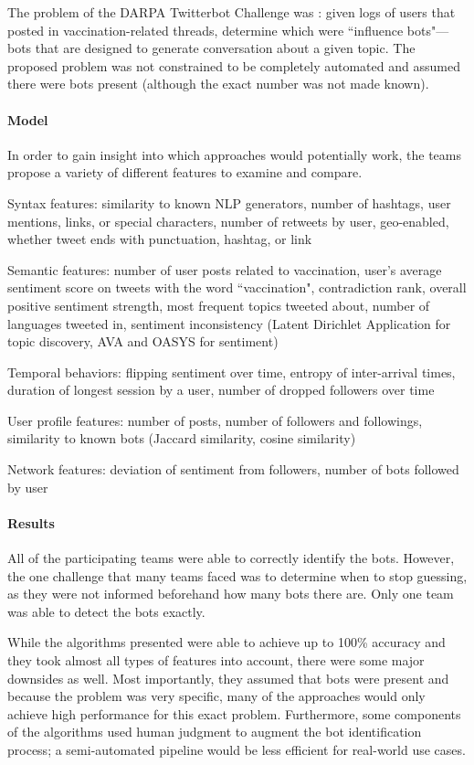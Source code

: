 \documentclass[11pt, oneside]{article}   	%
\begin{document}
\quad The problem of the DARPA Twitterbot Challenge was \cite{darpa}: given logs of users that posted in vaccination-related threads, determine which were ``influence bots"---bots that are designed to generate conversation about a given topic.
The proposed problem was not constrained to be completely automated and assumed there were bots present (although the exact number was not made known).

\paragraph{Model}
\quad

\quad In order to gain insight into which approaches would potentially work, the teams propose a variety of different features to examine and compare.

Syntax features: similarity to known NLP generators, number of hashtags, user mentions, links, or special characters, number of retweets by user, geo-enabled, whether tweet ends with punctuation, hashtag, or link

Semantic features: number of user posts related to vaccination, user's average sentiment score on tweets with the word ``vaccination", contradiction rank, overall positive sentiment strength, most frequent topics tweeted about, number of languages tweeted in, sentiment inconsistency (Latent Dirichlet Application for topic discovery, AVA and OASYS for sentiment)

Temporal behaviors: flipping sentiment over time, entropy of inter-arrival times, duration of longest session by a user, number of dropped followers over time

User profile features: number of posts, number of followers and followings, similarity to known bots (Jaccard similarity, cosine similarity)

Network features: deviation of sentiment from followers, number of bots followed by user

\paragraph{Results}
\quad

\quad All of the participating teams were able to correctly identify the bots.
However, the one challenge that many teams faced was to determine when to stop guessing, as they were not informed beforehand how many bots there are.
Only one team was able to detect the bots exactly.

\quad While the algorithms presented were able to achieve up to 100\% accuracy and they took almost all types of features into account, there were some major downsides as well.
Most importantly, they assumed that bots were present and because the problem was very specific, many of the approaches would only achieve high performance for this exact problem.
Furthermore, some components of the algorithms used human judgment to augment the bot identification process; a semi-automated pipeline would be less efficient for real-world use cases.
\end{document}
